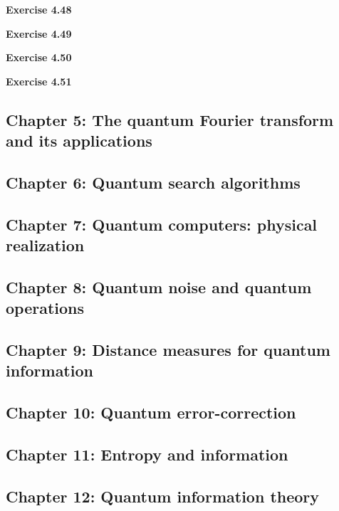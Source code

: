 \documentclass{article}
\begin{document}
\bigskip

\begin{framed}
    \noindent \textbf{Exercise 4.48}
    
    \medskip
    
    
\end{framed}


\bigskip

\begin{framed}
    \noindent \textbf{Exercise 4.49}
    
    \medskip
    
    
\end{framed}


\bigskip

\begin{framed}
    \noindent \textbf{Exercise 4.50}
    
    \medskip
    
    
\end{framed}


\bigskip

\begin{framed}
    \noindent \textbf{Exercise 4.51}
    
    \medskip
    
    
\end{framed}

\subsection*{Chapter 5: The quantum Fourier transform and its applications}
\subsection*{Chapter 6: Quantum search algorithms}
\subsection*{Chapter 7: Quantum computers: physical realization}
\subsection*{Chapter 8: Quantum noise and quantum operations}
\subsection*{Chapter 9: Distance measures for quantum information }
\subsection*{Chapter 10: Quantum error-correction}
\subsection*{Chapter 11: Entropy and information}
\subsection*{Chapter 12: Quantum information theory }
\end{document}
